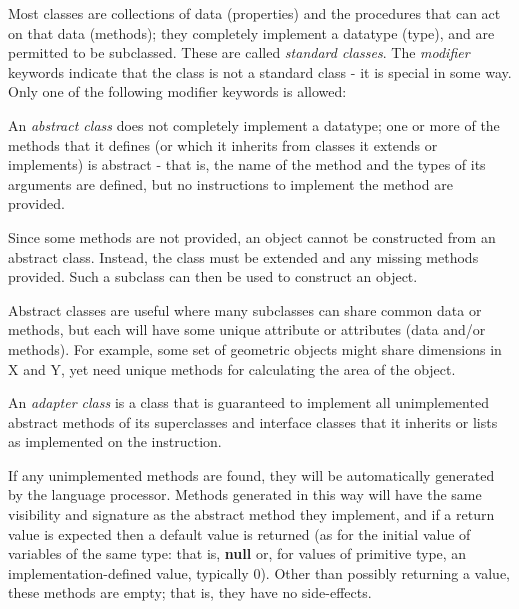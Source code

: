 Most classes are collections of data (properties) and the procedures
that can act on that data (methods); they completely implement a
datatype (type), and are permitted to be subclassed.
These are called \emph{standard classes}.
The \emph{modifier} keywords indicate that the class is not a standard
class - it is special in some way.
Only one of the following modifier keywords is allowed:
\begin{description}
\item[abstract]

An \emph{abstract class} does not completely implement a datatype; one
or more of the methods that it defines (or which it inherits from
classes it extends or implements) is abstract - that is, the name
of the method and the types of its arguments are defined, but no
instructions to implement the method are provided.
 
Since some methods are not provided, an object cannot be constructed
from an abstract class.  Instead, the class must be extended and any
missing methods provided.  Such a subclass can then be used to construct
an object.
 
Abstract classes are useful where many subclasses can share common data
or methods, but each will have some unique attribute or attributes (data
and/or methods).  For example, some set of geometric objects might share
dimensions in X and Y, yet need unique methods for calculating the area
of the object.
\item[adapter]

An \emph{adapter class} is a class that is guaranteed to implement all
unimplemented abstract methods of its superclasses and interface classes
that it inherits or lists as implemented on the  instruction.
 
If any unimplemented methods are found, they will be automatically
generated by the language processor.  Methods generated in this way will
have the same visibility and signature as the abstract method they
implement, and if a return value is expected then a default value is
returned (as for the initial value of variables of the same type: that
is, \textbf{null} or, for values of primitive type, an
implementation-defined value, typically 0).  Other than possibly
returning a value, these methods are empty; that is, they have no
side-effects.
 

\end{description}
